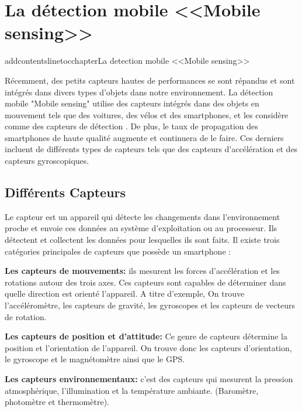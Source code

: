 
\chapter{La détection mobile <<Mobile sensing>>}
addcontentsline{toc}{chapter}{La detection mobile <<Mobile sensing>>}

Récemment, des petits capteurs hautes de performances se sont répandus et sont intégrés dans divers types d'objets dans notre environnement.\newline
La détection mobile "Mobile sensing" utilise des capteurs intégrés dans des objets en mouvement tels que des voitures, des vélos et des smartphones, et les considère comme des capteurs de détection \cite{nomuraMethodEstimatingRoad2015}.\newline
De plus, le taux de propagation des smartphones de haute qualité augmente et continuera de le faire. Ces derniers incluent de différents types de capteurs tels que des capteurs d'accélération et des capteurs gyroscopiques.



\section{Différents Capteurs} 

Le capteur est un appareil qui détecte les changements dans l'environnement proche et envoie ces données au système d'exploitation ou au processeur. Ils détectent et collectent les données pour lesquelles ils sont faits.\newline
Il existe trois catégories principales de capteurs que possède un smartphone \cite{tilluMobileSensorsComponents2019}:

{\bf Les capteurs de mouvements:}
 ils mesurent les forces d'accélération et les rotations autour des trois axes.  Ces capteurs sont capables de déterminer dans quelle direction est orienté l’appareil. A titre d’exemple, On trouve l'accéléromètre, les capteurs de gravité, les gyroscopes et les capteurs de vecteurs de rotation.

 {\bf Les capteurs de position et d’attitude:}
  Ce genre de capteurs détermine la position et l’orientation de l'appareil. On trouve donc les capteurs d’orientation, le gyroscope et le magnétomètre ainsi que le GPS. 
 
 {\bf Les capteurs environnementaux:}
 c’est des capteurs qui mesurent la pression atmosphérique, l'illumination et la température ambiante. (Baromètre, photomètre et thermomètre).

